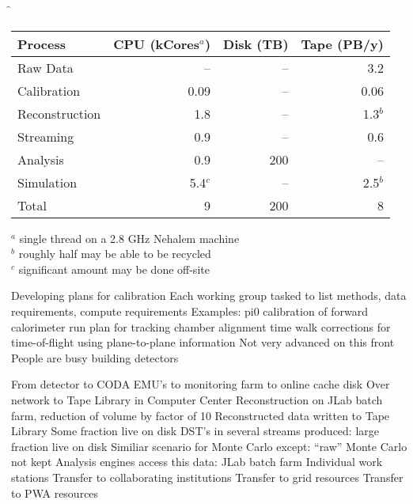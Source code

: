 \f{
\bc
\begin{tabular}{|l|r|r|r|}
\hline
Process & CPU (kCores$^a$) & Disk (TB) & Tape (PB/y)\\
\hline
Raw Data & -- & -- & 3.2 \\
Calibration & 0.09 & -- & 0.06 \\
Reconstruction & 1.8 & -- & 1.3$^b$ \\
Streaming & 0.9 & -- & 0.6 \\
Analysis & 0.9 & 200 & -- \\
Simulation & 5.4$^c$ & -- & 2.5$^b$ \\
\hline
Total & 9 & 200 & 8 \\
\hline
\end{tabular}
\ec
$^a$ single thread on a 2.8 GHz Nehalem machine \\
$^b$ roughly half may be able to be recycled \\
$^c$ significant amount may be done off-site \\
}


\I Developing plans for calibration
   \I Each working group tasked to list methods, data requirements, compute requirements
   \I Examples:
      \I pi0 calibration of forward calorimeter
      \I run plan for tracking chamber alignment
      \I time walk corrections for time-of-flight using plane-to-plane information
\I Not very advanced on this front
\I People are busy building detectors


   \I From detector to CODA EMU's to monitoring farm to online cache disk
   \I Over network to Tape Library in Computer Center
   \I Reconstruction on JLab batch farm, reduction of volume by factor of 10
   \I Reconstructed data written to Tape Library
   \I Some fraction live on disk
   \I DST's in several streams produced: large fraction live on disk
   \I Similiar scenario for Monte Carlo except:
      \I ``raw'' Monte Carlo not kept
   \I Analysis engines access this data:
      \I JLab batch farm
      \I Individual work stations
      \I Transfer to collaborating institutions
      \I Transfer to grid resources
      \I Transfer to PWA resources

